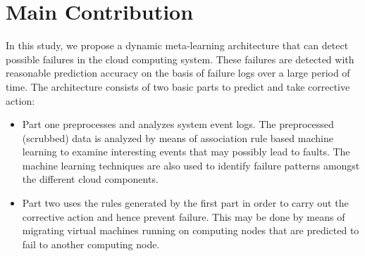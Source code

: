 \section{Main Contribution}
In this study, we propose a dynamic meta-learning architecture that can detect possible failures in the cloud computing system. These failures are detected with reasonable prediction accuracy on the basis of failure logs over a large period of time. The architecture consists of two basic parts to predict and take corrective action:
	\begin{itemize}
		\item Part one preprocesses and analyzes system event logs. The preprocessed (scrubbed) data is analyzed by means of association rule based machine learning to examine interesting events that may possibly lead to faults. The machine learning techniques are also used to identify failure patterns amongst the different cloud components.
		\item Part two uses the rules generated by the first part in order to carry out the corrective action and hence prevent failure. This may be done by means of migrating virtual machines running on computing nodes that are predicted to fail to another computing node.
	\end{itemize}

